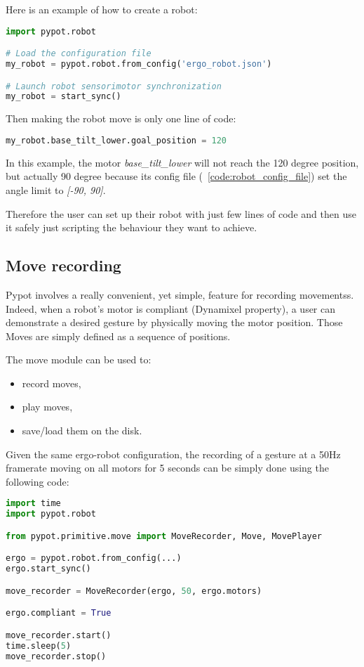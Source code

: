 Here is an example of how to create a robot:
\begin{lstlisting}[language = Python]
import pypot.robot

# Load the configuration file
my_robot = pypot.robot.from_config('ergo_robot.json')

# Launch robot sensorimotor synchronization
my_robot = start_sync()
\end{lstlisting}


Then making the robot move is only one line of code:
\begin{lstlisting}[language = Python]
my_robot.base_tilt_lower.goal_position = 120
\end{lstlisting}

In this example, the motor \emph{base\_tilt\_lower} will not reach the 120 degree position, but actually 90 degree because its config file (\codename~\ref{code:robot_config_file}) set the angle limit to \emph{[-90, 90]}.

Therefore the user can set up their robot with just few lines of code and then use it safely just scripting the behaviour they want to achieve.


\subsection{Move recording} %
\label{sub:move_recording}

Pypot involves a really convenient, yet simple, feature for recording movementss. Indeed, when a robot's motor is compliant (Dynamixel property), a user can demonstrate a desired gesture by physically moving the motor position. Those Moves are simply defined as a sequence of positions.

The move module can be used to:

\begin{itemize}
    \item record moves,
    \item play moves,
    \item save/load them on the disk.
\end{itemize}

Given the same ergo-robot configuration, the recording of a gesture at a 50Hz framerate moving on all motors for 5 seconds can be simply done using the following code:

\begin{lstlisting}[language = Python]
import time
import pypot.robot

from pypot.primitive.move import MoveRecorder, Move, MovePlayer

ergo = pypot.robot.from_config(...)
ergo.start_sync()

move_recorder = MoveRecorder(ergo, 50, ergo.motors)

ergo.compliant = True

move_recorder.start()
time.sleep(5)
move_recorder.stop()
\end{lstlisting}

